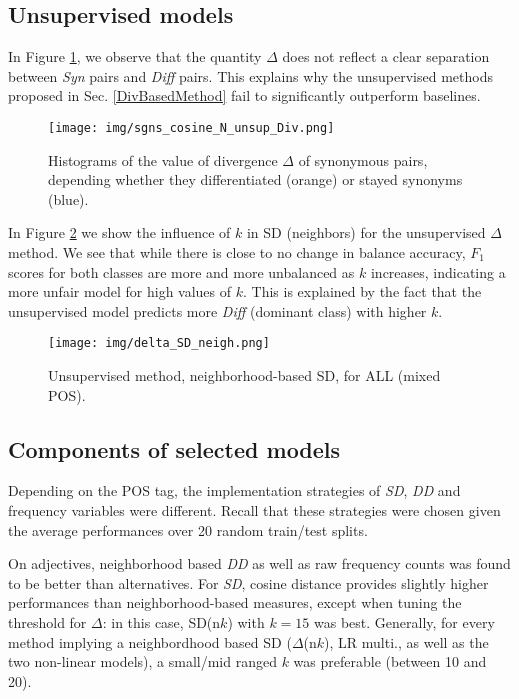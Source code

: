 \documentclass[11pt]{article}
\begin{document}
\subsection{Unsupervised models}
\label{appendix:unsup}

In Figure \ref{fig:divUnsupThresholds}, we observe that the quantity $\Delta$ does not reflect a clear separation between \textit{Syn} pairs and \textit{Diff} pairs. This explains why the unsupervised methods proposed in Sec. \ref{DivBasedMethod} fail to significantly outperform baselines.

\begin{figure}[ht]
    \centering
    \texttt{[image: img/sgns\_cosine\_N\_unsup\_Div.png]}
    \caption{Histograms of the value of divergence $\Delta$ of synonymous pairs, depending whether they differentiated (orange) or stayed synonyms (blue).}
    \label{fig:divUnsupThresholds}
\end{figure}

In Figure \ref{fig:deltaSDneigh} we show the influence of $k$ in SD (neighbors) for the unsupervised $\Delta$ method. We see that while there is close to no change in balance accuracy, $F_1$ scores for both classes are more and more unbalanced as $k$ increases, indicating a more unfair model for high values of $k$. This is explained by the fact that the unsupervised model predicts more \textit{Diff} (dominant class) with higher $k$.

\begin{figure}[ht]
    \centering \texttt{[image: img/delta\_SD\_neigh.png]}
    \caption{Unsupervised method, neighborhood-based SD, for ALL (mixed POS).}
    \label{fig:deltaSDneigh}
\end{figure}

\subsection{Components of selected models}
\label{appendix:models}

Depending on the POS tag, the implementation strategies of \textit{SD}, \textit{DD} and frequency variables were different. Recall that these strategies were chosen given the average performances over 20 random train/test splits.

On adjectives, neighborhood based \textit{DD} as well as raw frequency counts was found to be better than alternatives. For \textit{SD}, cosine distance provides slightly higher performances than neighborhood-based measures, except when tuning the threshold for $\Delta$: in this case, SD(n$k$) with $k=15$ was best. Generally, for every method implying a neighbordhood based SD ($\Delta$(n$k$), LR multi., as well as the two non-linear models), a small/mid ranged $k$ was preferable (between 10 and 20).
\end{document}
